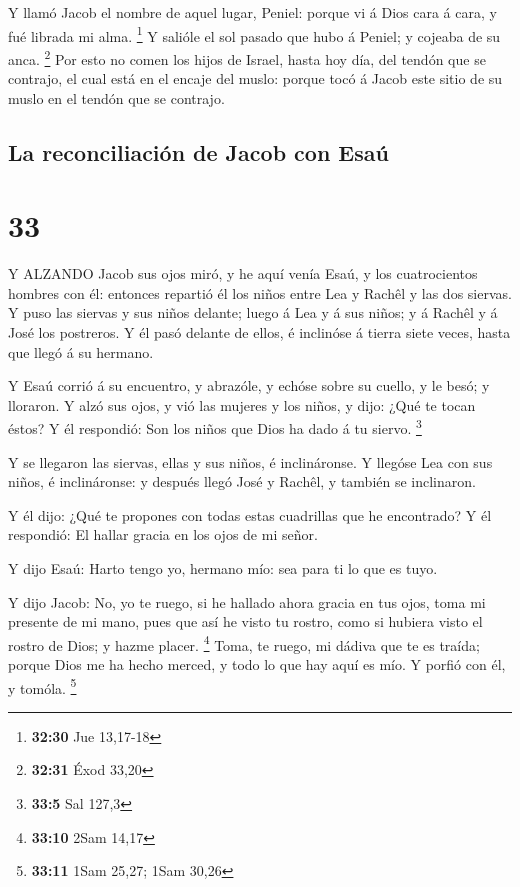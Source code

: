  Y llamó Jacob el nombre de aquel lugar, Peniel: porque vi
á Dios cara á cara, y fué librada mi alma. \footnote{\textbf{32:30} Jue
  13,17-18}  Y salióle el sol pasado que hubo á Peniel; y
cojeaba de su anca. \footnote{\textbf{32:31} Éxod 33,20} 
Por esto no comen los hijos de Israel, hasta hoy día, del tendón que se
contrajo, el cual está en el encaje del muslo: porque tocó á Jacob este
sitio de su muslo en el tendón que se contrajo.

\hypertarget{la-reconciliaciuxf3n-de-jacob-con-esauxfa}{%
\subsection{La reconciliación de Jacob con
Esaú}\label{la-reconciliaciuxf3n-de-jacob-con-esauxfa}}

\hypertarget{section-32}{%
\section{33}\label{section-32}}

 Y ALZANDO Jacob sus ojos miró, y he aquí venía Esaú, y los
cuatrocientos hombres con él: entonces repartió él los niños entre Lea y
Rachêl y las dos siervas.  Y puso las siervas y sus niños
delante; luego á Lea y á sus niños; y á Rachêl y á José los postreros.
 Y él pasó delante de ellos, é inclinóse á tierra siete
veces, hasta que llegó á su hermano.

 Y Esaú corrió á su encuentro, y abrazóle, y echóse sobre su
cuello, y le besó; y lloraron.  Y alzó sus ojos, y vió las
mujeres y los niños, y dijo: ¿Qué te tocan éstos? Y él respondió: Son
los niños que Dios ha dado á tu siervo. \footnote{\textbf{33:5} Sal
  127,3}

 Y se llegaron las siervas, ellas y sus niños, é
inclináronse.  Y llegóse Lea con sus niños, é inclináronse:
y después llegó José y Rachêl, y también se inclinaron.

 Y él dijo: ¿Qué te propones con todas estas cuadrillas que
he encontrado? Y él respondió: El hallar gracia en los ojos de mi señor.

 Y dijo Esaú: Harto tengo yo, hermano mío: sea para ti lo
que es tuyo.

 Y dijo Jacob: No, yo te ruego, si he hallado ahora gracia
en tus ojos, toma mi presente de mi mano, pues que así he visto tu
rostro, como si hubiera visto el rostro de Dios; y hazme placer.
\footnote{\textbf{33:10} 2Sam 14,17}  Toma, te ruego, mi
dádiva que te es traída; porque Dios me ha hecho merced, y todo lo que
hay aquí es mío. Y porfió con él, y tomóla. \footnote{\textbf{33:11}
  1Sam 25,27; 1Sam 30,26}

